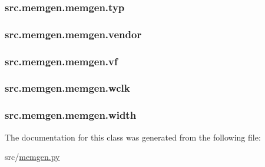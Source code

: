 \hypertarget{classsrc_1_1memgen_1_1memgen_aa5f9640ffa74723720817f5f54ad1f47}{
\subsubsection[{typ}]{\setlength{\rightskip}{0pt plus 5cm}src.\-memgen.\-memgen.\-typ}}\label{classsrc_1_1memgen_1_1memgen_aa5f9640ffa74723720817f5f54ad1f47}
\hypertarget{classsrc_1_1memgen_1_1memgen_ae4628b0e01befe26d41770f749ec5784}{
\subsubsection[{vendor}]{\setlength{\rightskip}{0pt plus 5cm}src.\-memgen.\-memgen.\-vendor}}\label{classsrc_1_1memgen_1_1memgen_ae4628b0e01befe26d41770f749ec5784}
\hypertarget{classsrc_1_1memgen_1_1memgen_aa1ea18a72d5eb841fef73b8001ed6e76}{
\subsubsection[{vf}]{\setlength{\rightskip}{0pt plus 5cm}src.\-memgen.\-memgen.\-vf}}\label{classsrc_1_1memgen_1_1memgen_aa1ea18a72d5eb841fef73b8001ed6e76}
\hypertarget{classsrc_1_1memgen_1_1memgen_a1c1fc6f4740f81f1e67d7aa977b1ae85}{
\subsubsection[{wclk}]{\setlength{\rightskip}{0pt plus 5cm}src.\-memgen.\-memgen.\-wclk}}\label{classsrc_1_1memgen_1_1memgen_a1c1fc6f4740f81f1e67d7aa977b1ae85}
\hypertarget{classsrc_1_1memgen_1_1memgen_ab3bc3f87c24cb7b34c653aeb94454b77}{
\subsubsection[{width}]{\setlength{\rightskip}{0pt plus 5cm}src.\-memgen.\-memgen.\-width}}\label{classsrc_1_1memgen_1_1memgen_ab3bc3f87c24cb7b34c653aeb94454b77}


The documentation for this class was generated from the following file\-:\begin{DoxyCompactItemize}
\item 
src/\hyperlink{memgen_8py}{memgen.\-py}\end{DoxyCompactItemize}
